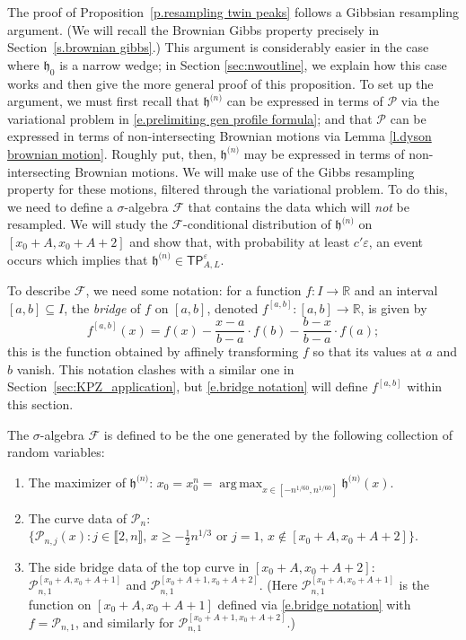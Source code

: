 \documentclass[oneside,final,11pt]{amsart}
\theoremstyle{definition}
\renewcommand{\L}{\CP}
\newcommand{\fh}{\mathfrak{h}}
\newcommand{\h}{\fh^{{\scriptscriptstyle(}n{\scriptscriptstyle)}}}
\newcommand{\TP}[1]{\mathsf{TP}_{\!\!#1}}
\newcommand{\R}{\mathbb{R}}
\newcommand{\1}[1]{\mathbf{1}_{#1}}
\newcommand{\eps}{\varepsilon}
\newcommand{\F}{\mathscr{F}}
\DeclareMathOperator*{\argmax}{arg\,max}
\newcommand{\smallconst}{c'}
\newcommand{\CP}{\mathcal{P}}
\numberwithin{equation}{section}
\begin{document}
The proof of Proposition~\ref{p.resampling twin peaks} follows a Gibbsian resampling argument. (We will recall the Brownian Gibbs property precisely in Section~\ref{s.brownian gibbs}.) This argument is considerably easier in the case where $\fh_0$ is a narrow wedge; in Section \ref{sec:nwoutline}, we explain how this case works and then give the more general proof of this proposition. To set up the argument, we must first recall that $\h$ can be expressed in terms of $\L$ via the variational problem in \eqref{e.prelimiting gen profile formula}; and that $\L$ can be expressed in terms of non-intersecting Brownian motions via Lemma \ref{l.dyson brownian motion}. Roughly put, then, $\h$ may be expressed in terms of non-intersecting Brownian motions. We will make use of the Gibbs resampling property for these motions, filtered through the variational problem. To do this, we need to define a $\sigma$-algebra $\F$ that contains the data which will \emph{not} be resampled. We will study the $\F$-conditional distribution of $\h$ on $[x_0+A,x_0+A+2]$ and show that, with probability at least $\smallconst \varepsilon$, an event occurs  which implies that $\h \in \TP{A,L}^\eps$.

To describe $\F$, we need some notation: for a function $f:I\to \R$ and an interval $[a,b]\subseteq I$,  the \emph{bridge} of $f$ on $[a,b]$, denoted $f^{[a,b]}:[a,b]\to \R$, is given by
%
\begin{equation}\label{e.bridge notation}
f^{[a,b]}(x) = f(x) - \frac{x-a}{b-a}\cdot f(b) - \frac{b-x}{b-a}\cdot f(a);
\end{equation}
this is the function obtained by affinely transforming $f$ so that its values at $a$ and $b$ vanish. This notation clashes with a similar one in Section~\ref{sec:KPZ_application}, but \eqref{e.bridge notation} will define $f^{[a,b]}$ within this section.

The $\sigma$-algebra $\F$ is defined to be the one generated by the following collection of random variables:
%
\begin{enumerate}
  \item The maximizer of $\h$: $x_0 = x_0^{n} = \argmax_{x\in[-n^{1/60}, n^{1/60}]} \h(x)$.
  \item The curve data of $\L_n$: $\big\{\L_{n,j}(x): j \in\llbracket2,n\rrbracket,\, x\geq -\frac{1}{2}n^{1/3} \text{ or } j=1,\, x\not\in [x_0+A, x_0+A+2]\big\}$.
  \item The side bridge data of the top curve in $[x_0+A, x_0+A+2]$: $\L_{n,1}^{[x_0+A,x_0+A+1]}$ and $\L_{n,1}^{[x_0+A+1,x_0+A+2]}$.
  (Here $\L_{n,1}^{[x_0+A,x_0+A+1]}$ is the function on $[x_0+A,x_0+A+1]$ defined via \eqref{e.bridge notation} with $f= \L_{n,1}$, and similarly for $\L_{n,1}^{[x_0+A+1,x_0+A+2]}$.)
\end{enumerate}
\end{document}

